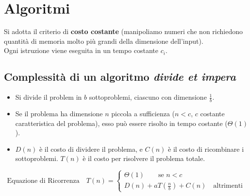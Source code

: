 \documentclass[10pt,a4paper]{article}
\begin{document}
\section*{Algoritmi}

Si adotta il criterio di \textbf{costo costante} (manipoliamo numeri che non richiedono quantit\`a di memoria molto pi\`u grandi della dimensione dell'input). \\
Ogni istruzione viene eseguita in un tempo costante $c_i$.

\subsection*{Complessit\`a di un algoritmo \textit{divide et impera}}
\begin{itemize}
    \item Si divide il problem in $b$ sottoproblemi, ciascuno con dimensione $\frac{1}{b}$.
    \item Se il problema ha dimensione $n$ piccola a sufficienza ($n < c$, $c$ costante caratteristica del problema), esso pu\`o essere risolto in tempo costante ($\Theta(1)$).
    \item $D(n)$ \`e il costo di dividere il problema, e $C(n)$ \`e il costo di ricombinare i sottoproblemi. $T(n)$ \`e il costo per risolvere il problema totale.
\end{itemize}
\begin{equation*}
    \text{Equazione di Ricorrenza} \quad T(n) = 
    \begin{cases}
        \Theta(1) \qquad \text{se } n < c\\
        D(n) + aT(\frac{n}{b}) + C(n) \quad  \text{altrimenti}
    \end{cases}
\end{equation*}

\pagebreak
\end{document}

